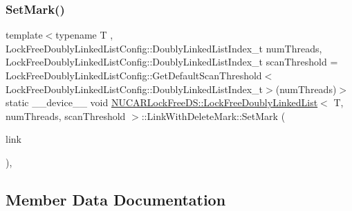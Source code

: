 \subsubsection{\texorpdfstring{Set\+Mark()}{SetMark()}}
{\footnotesize\ttfamily template$<$typename T , Lock\+Free\+Doubly\+Linked\+List\+Config\+::\+Doubly\+Linked\+List\+Index\+\_\+t num\+Threads, Lock\+Free\+Doubly\+Linked\+List\+Config\+::\+Doubly\+Linked\+List\+Index\+\_\+t scan\+Threshold = Lock\+Free\+Doubly\+Linked\+List\+Config\+::\+Get\+Default\+Scan\+Threshold$<$\+Lock\+Free\+Doubly\+Linked\+List\+Config\+::\+Doubly\+Linked\+List\+Index\+\_\+t$>$(num\+Threads)$>$ \\
static \+\_\+\+\_\+device\+\_\+\+\_\+ void \mbox{\hyperlink{class_n_u_c_a_r_lock_free_d_s_1_1_lock_free_doubly_linked_list}{N\+U\+C\+A\+R\+Lock\+Free\+D\+S\+::\+Lock\+Free\+Doubly\+Linked\+List}}$<$ T, num\+Threads, scan\+Threshold $>$\+::Link\+With\+Delete\+Mark\+::\+Set\+Mark (\begin{DoxyParamCaption}\item[{\mbox{\hyperlink{class_n_u_c_a_r_lock_free_d_s_1_1_lock_free_doubly_linked_list_1_1_link_with_delete_mark}{Link\+With\+Delete\+Mark}} $\ast$}]{link }\end{DoxyParamCaption})\hspace{0.3cm}{\ttfamily [inline]}, {\ttfamily [static]}}



\subsection{Member Data Documentation}
\mbox{\label{class_n_u_c_a_r_lock_free_d_s_1_1_lock_free_doubly_linked_list_1_1_link_with_delete_mark_aa3e6d661a7dfd3ebeca045ddb2fe07dc}} 
